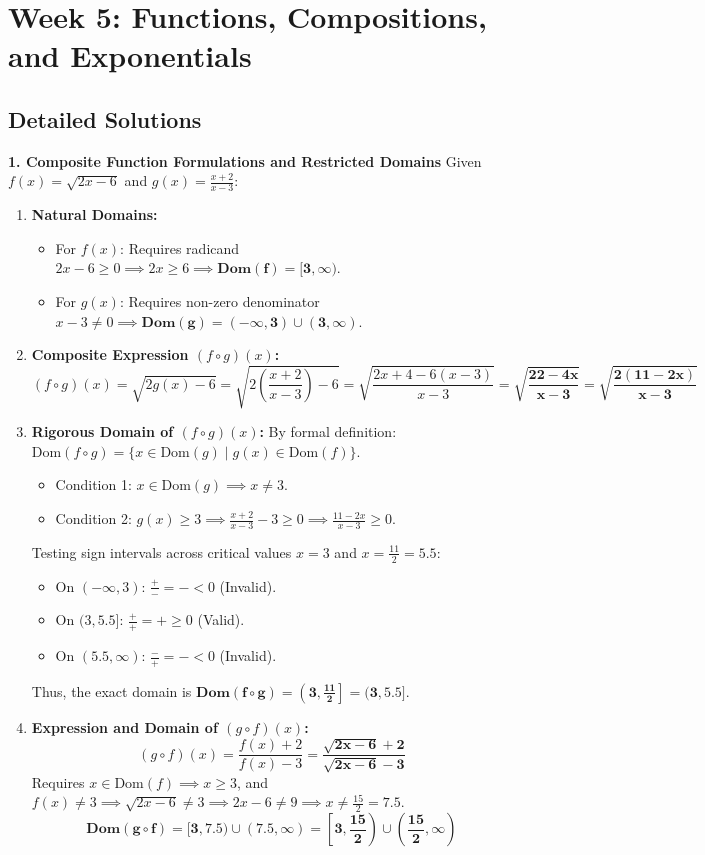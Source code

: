 \section*{Week 5: Functions, Compositions, and Exponentials}

\subsection*{Detailed Solutions}

\textbf{1. Composite Function Formulations and Restricted Domains}
Given $f(x) = \sqrt{2x - 6}$ and $g(x) = \frac{x + 2}{x - 3}$:
\begin{enumerate}
    \item \textbf{Natural Domains:}
    \begin{itemize}
        \item For $f(x)$: Requires radicand $2x - 6 \ge 0 \implies 2x \ge 6 \implies \mathbf{\text{Dom}(f) = [3, \infty)}$.
        \item For $g(x)$: Requires non-zero denominator $x - 3 \neq 0 \implies \mathbf{\text{Dom}(g) = (-\infty, 3) \cup (3, \infty)}$.
    \end{itemize}
    \item \textbf{Composite Expression $(f \circ g)(x)$:}
    $$(f \circ g)(x) = \sqrt{2g(x) - 6} = \sqrt{2\left(\frac{x + 2}{x - 3}\right) - 6} = \sqrt{\frac{2x + 4 - 6(x - 3)}{x - 3}} = \mathbf{\sqrt{\frac{22 - 4x}{x - 3}} = \sqrt{\frac{2(11 - 2x)}{x - 3}}}$$
    \item \textbf{Rigorous Domain of $(f \circ g)(x)$:}
    By formal definition: $\text{Dom}(f \circ g) = \{x \in \text{Dom}(g) \mid g(x) \in \text{Dom}(f)\}$.
    \begin{itemize}
        \item Condition 1: $x \in \text{Dom}(g) \implies x \neq 3$.
        \item Condition 2: $g(x) \ge 3 \implies \frac{x + 2}{x - 3} - 3 \ge 0 \implies \frac{11 - 2x}{x - 3} \ge 0$.
    \end{itemize}
    Testing sign intervals across critical values $x = 3$ and $x = \frac{11}{2} = 5.5$:
    \begin{itemize}
        \item On $(-\infty, 3)$: $\frac{+}{-} = - < 0$ (Invalid).
        \item On $(3, 5.5]$: $\frac{+}{+} = + \ge 0$ (Valid).
        \item On $(5.5, \infty)$: $\frac{-}{+} = - < 0$ (Invalid).
    \end{itemize}
    Thus, the exact domain is $\mathbf{\text{Dom}(f \circ g) = \left(3, \frac{11}{2}\right] = (3, 5.5]}$.
    \item \textbf{Expression and Domain of $(g \circ f)(x)$:}
    $$(g \circ f)(x) = \frac{f(x) + 2}{f(x) - 3} = \mathbf{\frac{\sqrt{2x - 6} + 2}{\sqrt{2x - 6} - 3}}$$
    Requires $x \in \text{Dom}(f) \implies x \ge 3$, and $f(x) \neq 3 \implies \sqrt{2x - 6} \neq 3 \implies 2x - 6 \neq 9 \implies x \neq \frac{15}{2} = 7.5$.
    $$\mathbf{\text{Dom}(g \circ f) = [3, 7.5) \cup (7.5, \infty) = \left[3, \frac{15}{2}\right) \cup \left(\frac{15}{2}, \infty\right)}$$
\end{enumerate}

